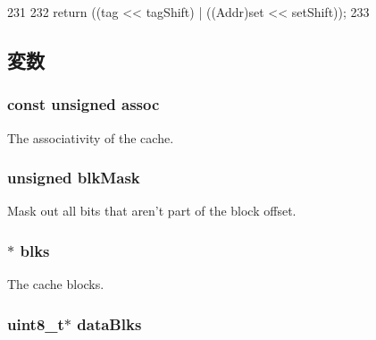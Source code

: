 \begin{DoxyCode}
231     {
232         return ((tag << tagShift) | ((Addr)set << setShift));
233     }
\end{DoxyCode}


\subsection{変数}
\hypertarget{classLRU_accc9cc9a48a59881735c6aab4afc3ceb}{
\subsubsection[{assoc}]{\setlength{\rightskip}{0pt plus 5cm}const unsigned {\bf assoc}}}
\label{classLRU_accc9cc9a48a59881735c6aab4afc3ceb}
The associativity of the cache. \hypertarget{classLRU_a7dcd7050ee7dfacdc9057287efbe3aa6}{
\subsubsection[{blkMask}]{\setlength{\rightskip}{0pt plus 5cm}unsigned {\bf blkMask}}}
\label{classLRU_a7dcd7050ee7dfacdc9057287efbe3aa6}
Mask out all bits that aren't part of the block offset. \hypertarget{classLRU_adf78a0a96f176dd1b76d59906eda0c7d}{
\subsubsection[{blks}]{$\ast$ {\bf blks}}}
\label{classLRU_adf78a0a96f176dd1b76d59906eda0c7d}
The cache blocks. \hypertarget{classLRU_aec49d2d4de051250b86595f2ac472d42}{
\subsubsection[{dataBlks}]{\setlength{\rightskip}{0pt plus 5cm}uint8\_\-t$\ast$ {\bf dataBlks}}}
\label{classLRU_aec49d2d4de051250b86595f2ac472d42}
